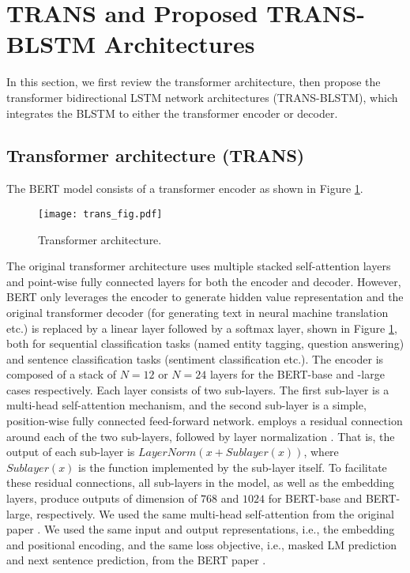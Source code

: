 \documentclass[11pt,a4paper]{article}
\begin{document}
\section{TRANS and Proposed TRANS-BLSTM Architectures}

In this section, we first review the transformer architecture, then propose the transformer bidirectional LSTM network architectures (TRANS-BLSTM), which integrates the BLSTM to either the transformer encoder or decoder. 

\subsection{Transformer architecture (TRANS)}
The BERT model consists of a transformer encoder \cite{aswani2017} as shown in Figure \ref{fig:trans}. 
\begin{figure}[!hbt]
    \centering
    \texttt{[image: trans\_fig.pdf]}
    \caption{Transformer architecture.}
    \label{fig:trans}
\end{figure}
The original transformer architecture uses multiple stacked self-attention layers and point-wise fully connected layers for both the encoder and decoder. However, BERT only leverages the encoder to generate hidden value representation and the original transformer decoder (for generating text in neural machine translation etc.) is replaced by a linear layer followed by a softmax layer, shown in Figure \ref{fig:trans}, both for sequential classification tasks (named entity tagging, question answering) and sentence classification tasks (sentiment classification etc.). The encoder is composed of a stack of $N=12$ or $N=24$ layers for the BERT-base and -large cases respectively. Each layer consists of two sub-layers. The first sub-layer is a multi-head self-attention mechanism, and the second sub-layer is a simple, position-wise fully connected feed-forward network. \cite{aswani2017} employs a residual connection \cite{kaiming2016} around each of the two sub-layers, followed by layer normalization \cite{jimmy2016}. That is, the output of each sub-layer is $LayerNorm(x+Sublayer(x))$, where $Sublayer(x)$ is the function implemented by the sub-layer itself. To facilitate these residual connections, all sub-layers in the model, as well as the embedding layers, produce outputs of dimension of $768$ and $1024$ for BERT-base and BERT-large, respectively. We used the same multi-head self-attention from the original paper \cite{aswani2017}. We used the same input and output representations, i.e., the embedding and positional encoding, and the same loss objective, i.e., masked LM prediction and next sentence prediction, from the BERT paper \cite{devlin2018}.
\end{document}
